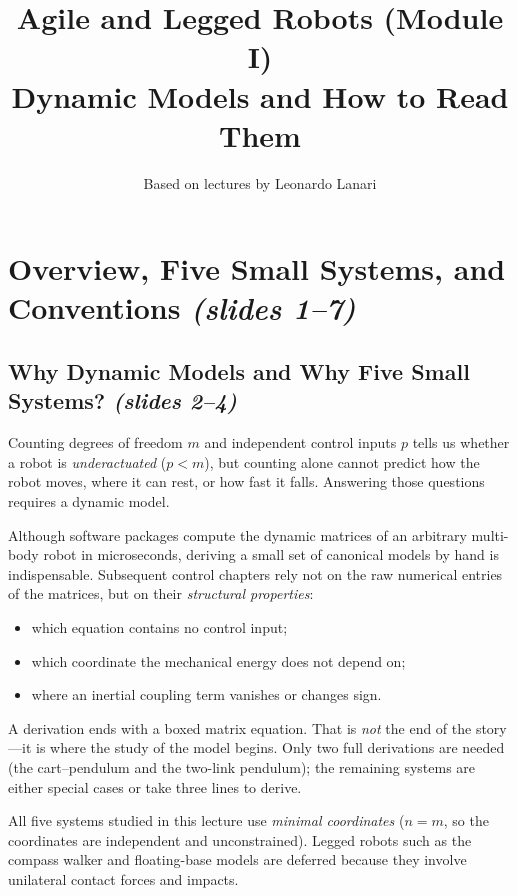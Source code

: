 \documentclass[11pt, a4paper]{article}
\title{\textbf{Agile and Legged Robots (Module I)}\\[4pt]
\Large Dynamic Models and How to Read Them}
\author{Based on lectures by Leonardo Lanari}
\date{}
\theoremstyle{definition}
\theoremstyle{plain}
\begin{document}
\maketitle
\tableofcontents
\bigskip

\section{Overview, Five Small Systems, and Conventions \emph{(slides 1--7)}}

\subsection{Why Dynamic Models and Why Five Small Systems? \emph{(slides 2--4)}}

Counting degrees of freedom $m$ and independent control inputs $p$ tells us whether a robot is \emph{underactuated} ($p < m$), but counting alone cannot predict how the robot moves, where it can rest, or how fast it falls. Answering those questions requires a dynamic model.

Although software packages compute the dynamic matrices of an arbitrary multi-body robot in microseconds, deriving a small set of canonical models by hand is indispensable. Subsequent control chapters rely not on the raw numerical entries of the matrices, but on their \emph{structural properties}:
\begin{itemize}
  \item which equation contains no control input;
  \item which coordinate the mechanical energy does not depend on;
  \item where an inertial coupling term vanishes or changes sign.
\end{itemize}

\begin{intuition}
A derivation ends with a boxed matrix equation. That is \emph{not} the end of the story---it is where the study of the model begins. Only two full derivations are needed (the cart--pendulum and the two-link pendulum); the remaining systems are either special cases or take three lines to derive.
\end{intuition}

All five systems studied in this lecture use \emph{minimal coordinates} ($n = m$, so the coordinates are independent and unconstrained). Legged robots such as the compass walker and floating-base models are deferred because they involve unilateral contact forces and impacts.
\end{document}
